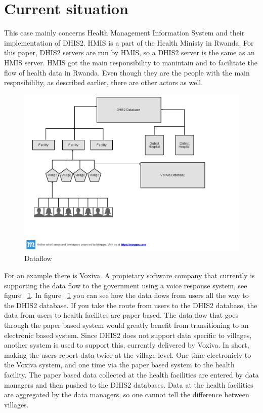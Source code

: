 \section{Current situation}
This case mainly concerns Health Management Information System and their implementation of DHIS2. HMIS is a part of the Health Ministy in Rwanda. For this paper, DHIS2 servers are run by HMIS, so a DHIS2 server is the same as an HMIS server. 
HMIS got the main responsibility to manintain and to facilitate the flow of health data in Rwanda. Even though they are the people with the main respnsibililty, as described earlier, there are other actors as well.
\begin{figure}
\centering
\includegraphics[width=12cm]{empirical/images/dataflow}
\caption{Dataflow}
\label{fig:dataflow}
\end{figure}
For an example there is Voxiva. A propietary software company that currently is supporting the data flow to the government using a voice response system, see figure ~\ref{fig:dataflow}. 
In figure ~\ref{fig:dataflow} you can see how the data flows from users all the way to the DHIS2 database. If you take the route from users to the DHIS2 database, the data from users to health facilites are paper based.
The data flow that goes through the paper based system would greatly benefit from transitioning to an electronic based system.
Since DHIS2 does not support data specific to villages, another system is used to support this, currently delivered by Voxiva.
In short, making the users report data twice at the village level. One time electronicly to the Voxiva system, and one time via the paper based system to the health facility.
The paper based data collected at the health facilities are entered by data managers and then pushed to the DHIS2 databases. Data at the health facilities are aggregated by the data managers, so one cannot tell the difference between villages. 
